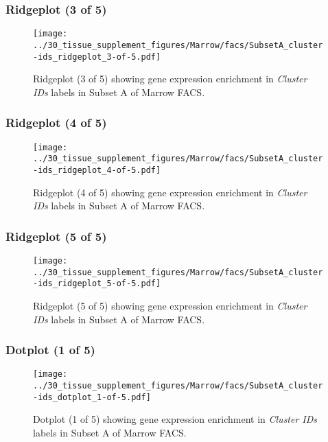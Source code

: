 \clearpage

\subsubsection{Ridgeplot (3 of 5)}
\begin{figure}[h]
\centering
\texttt{[image: ../30\_tissue\_supplement\_figures/Marrow/facs/SubsetA\_cluster-ids\_ridgeplot\_3-of-5.pdf]}

\caption{ Ridgeplot (3 of 5)  showing gene expression enrichment in \emph{Cluster IDs} labels in Subset A of Marrow FACS. }
\end{figure}


\clearpage

\subsubsection{Ridgeplot (4 of 5)}
\begin{figure}[h]
\centering
\texttt{[image: ../30\_tissue\_supplement\_figures/Marrow/facs/SubsetA\_cluster-ids\_ridgeplot\_4-of-5.pdf]}

\caption{ Ridgeplot (4 of 5)  showing gene expression enrichment in \emph{Cluster IDs} labels in Subset A of Marrow FACS. }
\end{figure}


\clearpage

\subsubsection{Ridgeplot (5 of 5)}
\begin{figure}[h]
\centering
\texttt{[image: ../30\_tissue\_supplement\_figures/Marrow/facs/SubsetA\_cluster-ids\_ridgeplot\_5-of-5.pdf]}

\caption{ Ridgeplot (5 of 5)  showing gene expression enrichment in \emph{Cluster IDs} labels in Subset A of Marrow FACS. }
\end{figure}


\clearpage

\subsubsection{Dotplot (1 of 5)}
\begin{figure}[h]
\centering
\texttt{[image: ../30\_tissue\_supplement\_figures/Marrow/facs/SubsetA\_cluster-ids\_dotplot\_1-of-5.pdf]}

\caption{ Dotplot (1 of 5)  showing gene expression enrichment in \emph{Cluster IDs} labels in Subset A of Marrow FACS. }
\end{figure}


